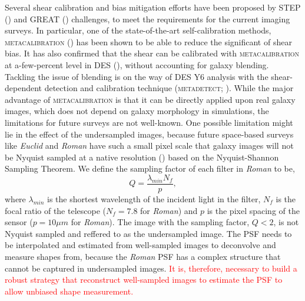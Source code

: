 {Several shear calibration and bias mitigation efforts have been proposed by STEP (\citealt{2006MNRAS.368.1323H, 2007MNRAS.376...13M}) and GREAT (\citealt{2010MNRAS.405.2044B, 2013ApJS..205...12K, 2015MNRAS.450.2963M}) challenges, to meet the requirements for the current imaging surveys. In particular, one of the state-of-the-art self-calibration methods, \textsc{metacalibration} (\citealt{2017arXiv170202600H, 2017ApJ...841...24S}) has been shown to be able to reduce the significant of shear bias. It has also confirmed that the shear can be calibrated with \textsc{metacalibration} at a-few-percent level in DES (\citealt{2018MNRAS.481.1149Z, 2020arXiv201103408G}), without accounting for galaxy blending. Tackling the issue of blending is on the way of DES Y6 analysis with the shear-dependent detection and calibration technique (\textsc{metadetect}; \citealt{2020ApJ...902..138S}). While the major advantage of \textsc{metacalibration} is that it can be directly applied upon real galaxy images, which does not depend on galaxy morphology in simulations, the limitations for future surveys are not well-known. One possible limitation might lie in the effect of the undersampled images, because future space-based surveys like \emph{Euclid} and \emph{Roman} have such a small pixel scale that galaxy images will not be Nyquist sampled at a native resolution (\citealt{2013PASP..125.1496S}) based on the Nyquist-Shannon Sampling Theorem. We define the sampling factor of each filter in \emph{Roman} to be, 
\begin{equation}
    Q = \frac{\lambda_{min}N_{f}}{p}, 
    \label{eqn:sampling}
\end{equation}
where $\lambda_{min}$ is the shortest wavelength of the incident light in the filter, $N_{f}$ is the focal ratio of the telescope ($N_{f}=7.8$ for \emph{Roman}) and $p$ is the pixel spacing of the sensor ($p=10\mu m$ for \emph{Roman}). The image with the sampling factor, $Q < 2$, is not Nyquist sampled and reffered to as the undersampled image. The PSF needs to be interpolated and estimated from well-sampled images to deconvolve and measure shapes from, because the \emph{Roman} PSF has a complex structure that cannot be captured in undersampled images. \textcolor{red}{It is, therefore, necessary to build a robust strategy that reconstruct well-sampled images to estimate the PSF to allow unbiased shape measurement. }


}
